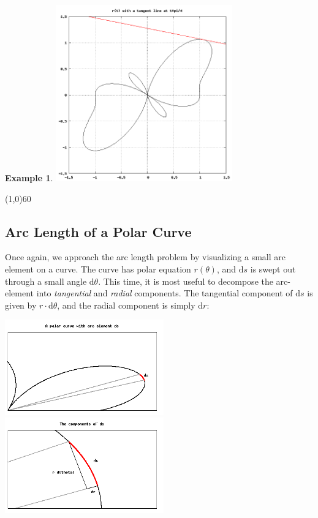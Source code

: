 \documentclass[10.5pt,twoside]{report}
\theoremstyle{definition}
\newtheorem{exmp}{Example}[section]
\begin{document}
\begin{exmp}
\includegraphics[width=3in]{example_5_4_1_1}

\end{exmp}

\line(1,0){60}
\linethickness{0.5mm}


\subsection{Arc Length of a Polar Curve}

Once again, we approach the arc length problem by visualizing a small arc element on a curve.  The curve has polar equation $r(\theta)$, and $\mathrm{d}s$ is swept out through a small angle $\mathrm{d}\theta$.  This time, it is most useful to decompose the arc-element into \textit{tangential} and \textit{radial} components.  The tangential component of $\mathrm{d}s$ is given by $r\cdot \mathrm{d}\theta$, and the radial component is simply $\mathrm{d}r$:

\includegraphics[width=2.7in]{figure_5_4_2_1}
\includegraphics[width=2.7in]{figure_5_4_2_2}
${}$\\
\end{document}
